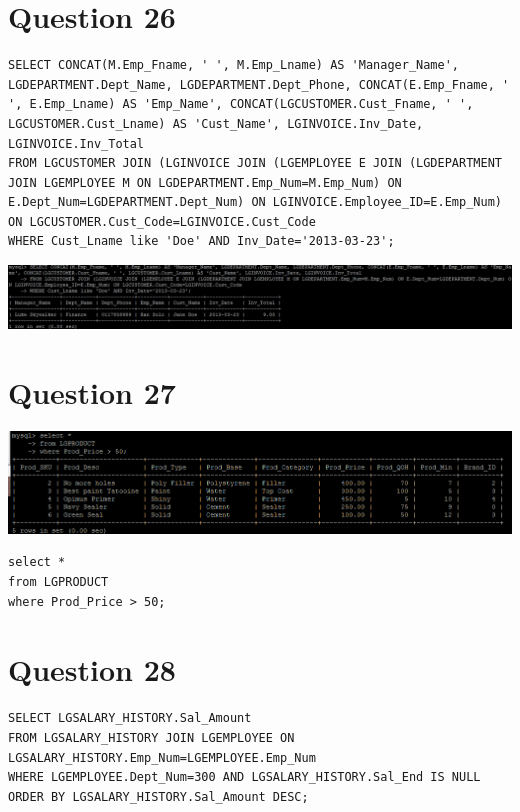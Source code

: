\documentclass[a4paper,10pt]{article}
\begin{document}
\section*{Question 26}
\lstset{
            language=SQL,
            breaklines=true
            }
        \begin{lstlisting}[frame=single]
        SELECT CONCAT(M.Emp_Fname, ' ', M.Emp_Lname) AS 'Manager_Name', LGDEPARTMENT.Dept_Name, LGDEPARTMENT.Dept_Phone, CONCAT(E.Emp_Fname, ' ', E.Emp_Lname) AS 'Emp_Name', CONCAT(LGCUSTOMER.Cust_Fname, ' ', LGCUSTOMER.Cust_Lname) AS 'Cust_Name', LGINVOICE.Inv_Date, LGINVOICE.Inv_Total
FROM LGCUSTOMER JOIN (LGINVOICE JOIN (LGEMPLOYEE E JOIN (LGDEPARTMENT JOIN LGEMPLOYEE M ON LGDEPARTMENT.Emp_Num=M.Emp_Num) ON E.Dept_Num=LGDEPARTMENT.Dept_Num) ON LGINVOICE.Employee_ID=E.Emp_Num) ON LGCUSTOMER.Cust_Code=LGINVOICE.Cust_Code
WHERE Cust_Lname like 'Doe' AND Inv_Date='2013-03-23';

        \end{lstlisting}
\includegraphics{Queries/Question_26/Q26_screenshot.jpg}
\section*{Question 27}
\includegraphics{Queries/Question_27/Question_27_screenshot.PNG}
\lstset{
            language=SQL,
            breaklines=true
            }
        \begin{lstlisting}[frame=single]
        select * 
from LGPRODUCT 
where Prod_Price > 50;
        \end{lstlisting}
\section*{Question 28}
\lstset{
            language=SQL,
            breaklines=true
            }
        \begin{lstlisting}[frame=single]
        SELECT LGSALARY_HISTORY.Sal_Amount
FROM LGSALARY_HISTORY JOIN LGEMPLOYEE ON LGSALARY_HISTORY.Emp_Num=LGEMPLOYEE.Emp_Num
WHERE LGEMPLOYEE.Dept_Num=300 AND LGSALARY_HISTORY.Sal_End IS NULL
ORDER BY LGSALARY_HISTORY.Sal_Amount DESC;

        \end{lstlisting}
\end{document}
